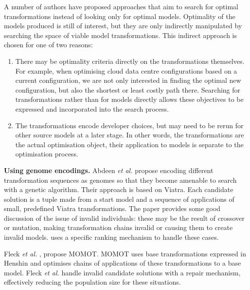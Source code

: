 		A number of authors have proposed approaches that aim to search for optimal transformations instead of looking only for optimal models. Optimality of the
		models produced is still of interest, but they are only indirectly manipulated by searching the space of viable model transformations. This indirect approach
		is chosen for one of two reasons: 
		\begin{enumerate}
			\item There may be optimality criteria directly on the transformations themselves. For example, when optimising cloud data centre configurations based on a
			      current configuration, we are not only interested in finding the optimal new configuration, but also the shortest or least costly path there.
						Searching for transformations rather than for models directly allows these objectives to be expressed and incorporated into the search process.
		  \item The transformations encode developer choices, but may need to be rerun for other source models at a later stage. In other words, the transformations
			      are the actual optimisation object, their application to models is separate to the optimisation process.
		\end{enumerate}
			
		\textbf{Using genome encodings.}
			Abdeen \emph{et al.} \cite{Abdeen+14} propose encoding different transformation sequences as genomes so that they become amenable to search
			with a genetic algorithm. Their approach is based on Viatra. Each candidate solution is a tuple made from a start model and a sequence of applications of
			small, predefined Viatra transformations. The paper provides some good discussion of the issue of invalid individuals: these may be the result of crossover
			or mutation, making transformation chains invalid or causing them to create invalid models. \cite{Abdeen+14} uses a specific ranking mechanism to handle
			these cases.
			
			Fleck \emph{et al.} \cite{Fleck+15}, propose MOMOT. MOMOT uses base transformations expressed in Henshin and optimises chains of applications of these
			transformations to a base model. Fleck \emph{et al.} handle invalid candidate solutions with a repair mechanism, effectively reducing the population size
			for these situations.
		

